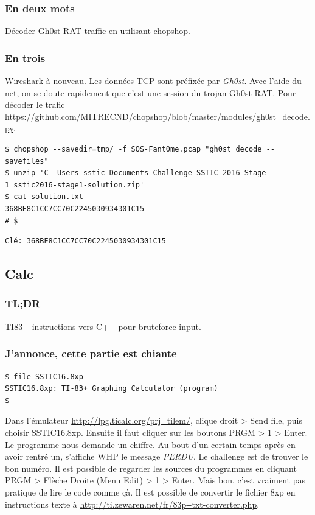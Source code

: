 \documentclass[14pt]{article}
\begin{document}
\subsubsection{En deux mots}
 Décoder Gh0st RAT traffic en utilisant chopshop.

\subsubsection{En trois}

Wireshark à nouveau. Les données TCP sont préfixée par {\em Gh0st}. Avec l'aide du net, on se doute rapidement que c'est une session du trojan Gh0st RAT. Pour décoder le trafic \url{https://github.com/MITRECND/chopshop/blob/master/modules/gh0st_decode.py}.


\begin{verbatim}
$ chopshop --savedir=tmp/ -f SOS-Fant0me.pcap "gh0st_decode --savefiles"
$ unzip 'C__Users_sstic_Documents_Challenge SSTIC 2016_Stage 1_sstic2016-stage1-solution.zip'
$ cat solution.txt
368BE8C1CC7CC70C2245030934301C15
# $
\end{verbatim}

\begin{verbatim}
Clé: 368BE8C1CC7CC70C2245030934301C15
\end{verbatim}

\FloatBarrier
\subsection{Calc}

\subsubsection{TL;DR}
TI83+ instructions vers C++ pour bruteforce input.

\subsubsection{J'annonce, cette partie est chiante}

\begin{verbatim}
$ file SSTIC16.8xp
SSTIC16.8xp: TI-83+ Graphing Calculator (program)
$
\end{verbatim}

Dans l'émulateur \url{http://lpg.ticalc.org/prj_tilem/}, clique droit > Send file, puis choisir SSTIC16.8xp.
Ensuite il faut cliquer sur les boutons PRGM > 1 > Enter. Le programme nous demande un chiffre. Au bout d'un certain temps après en avoir rentré un, s'affiche WHP le message {\em PERDU}.
Le challenge est de trouver le bon numéro. Il est possible de regarder les sources du programmes en cliquant PRGM > Flèche Droite (Menu Edit) > 1 > Enter. Mais bon, c'est vraiment pas pratique de lire le code comme çà. Il est possible de convertir le fichier 8xp en instructions texte à \url{http://ti.zewaren.net/fr/83p--txt-converter.php}.
\end{document}

